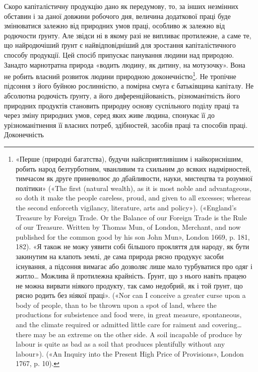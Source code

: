 Скоро капіталістичну продукцію дано як передумову, то, за
інших незмінних обставин і за даної довжини робочого дня, величина
додаткової праці буде змінюватися залежно від природних
умов праці, особливо ж залежно від родючости ґрунту. Але звідси
ні в якому разі не випливає протилежне, а саме те, що найродючіший
ґрунт є найвідповідніший для зростання капіталістичного
способу продукції. Цей спосіб припускає панування людини над
природою. Занадто марнотратна природа «водить людину, як
дитину, на мотузочку». Вона не робить власний розвиток людини
природною доконечністю\footnote{
«Перше (природні багатства), будучи найсприятливішим і найкориснішим,
робить народ безтурботним, чванливим та схильним до всяких
надмірностей, тимчасом як друге приневолює до дбайливости, науки,
мистецтва та розумної політики» («The first (natural wealth), as it
is most noble and advantageous, so doth it make the people careless, proud,
and given to all excesses; whereas the second enforceth vigilancy, literature,
arts and policy»). («England’s Treasure by Foreign Trade. Or the Balance
of our Foreign Trade is the Rule of our Treasure. Written by Thomas Mun,
of London, Merchant, and now published for the common good by his son
John Mun», London 1669, p. 181, 182). «Я також не можу уявити собі
більшого прокляття для народу, як бути закинутим на клапоть землі,
де сама природа рясно продукує засоби існування, а підсоння вимагає
або дозволяє лише мало турбуватися про одяг і житло\dots{} Можлива й протилежна
крайність. Ґрунт, що з нього навіть працею не можна вирвати
ніякого продукту, так само недобрий, як і той ґрунт, що рясно родить
без ніякої праці». («Nor can I conceive a greater curse upon a body of people,
than to be thrown upon a spot of land, where the productions for subsistence
and food were, in great measure, spontaneous, and the climate required
or admitted little care for raiment and covering\dots{} there may be an extreme
on the other side. A soil incapable of produce by labour is quite as bad as
a soil that produces plentifully without any labour»). («An Inquiry into
the Present High Price of Provisions», London 1767, p. 10).
}. Не тропічне підсоння з його буйною
рослинністю, а помірна смуга є батьківщина капіталу. Не абсолютна
родючість ґрунту, а його диференційованість, різноманітність
його природних продуктів становить природну основу
суспільного поділу праці та через зміну природних умов, серед
яких живе людина, спонукає її до урізноманітнення її власних
потреб, здібностей, засобів праці та способів праці. Доконечність
